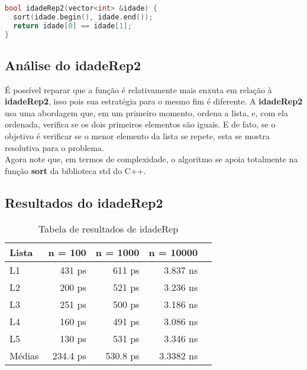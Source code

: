 \begin{lstlisting}[language=C++]
bool idadeRep2(vector<int> &idade) {
  sort(idade.begin(), idade.end());
  return idade[0] == idade[1];
}
\end{lstlisting}

\subsection{Análise do idadeRep2}

É possível reparar que a função é relativamente mais enxuta em relação à \textbf{idadeRep2}, isso pois sua estratégia para o mesmo fim é diferente. A \textbf{idadeRep2} usa uma abordagem que, em um primeiro momento, ordena a lista, e, com ela ordenada, verifica se os dois primeiros elementos são iguais. E de fato, se o objetivo é verificar se o menor elemento da lista se repete, esta se mostra resolutiva para o problema. \\
Agora note que, em termos de complexidade, o algoritmo se apoia totalmente na função \textbf{sort} da biblioteca std do C++.

\subsection{Resultados do idadeRep2}

\begin{table}[h!]
	\centering
	\caption{Tabela de resultados de idadeRep}
	\label{tab:idade_rep_result}
	\begin{tabular}{lrrrr}
		\toprule
		Lista   & n = 100   & n = 1000  & n = 10000 \\
		\midrule
		L1      & 431 ps    & 611 ps    & 3.837 ns  \\
		L2      & 200 ps    & 521 ps    & 3.236 ns  \\
		L3      & 251 ps    & 500 ps    & 3.186 ns  \\
		L4      & 160 ps    & 491 ps    & 3.086 ns  \\
		L5      & 130 ps    & 531 ps    & 3.346 ns  \\
		\midrule
		Médias  & 234.4 ps  & 530.8 ps  & 3.3382 ns \\
		\bottomrule
	\end{tabular}
\end{table}


